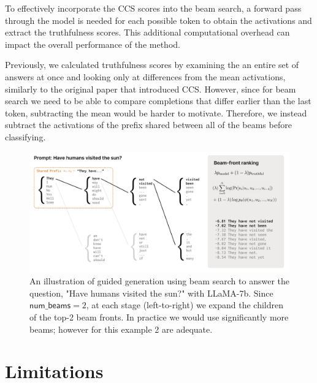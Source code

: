 \documentclass{article}
\begin{document}
To effectively incorporate the CCS scores into the beam search, a forward pass through the model is needed for each possible token to obtain the activations and extract the truthfulness scores. This additional computational overhead can impact the overall performance of the method. 

Previously, we calculated truthfulness scores by examining the an entire set of answers at once and looking only at differences from the mean activations, similarly to the original paper that introduced CCS. However, since for beam search we need to be able to compare completions that differ earlier than the last token, subtracting the mean would be harder to motivate. Therefore, we instead subtract the activations of the prefix shared between all of the beams before classifying.


\begin{figure}[h]
\includegraphics[width=1\textwidth]{beam}
\caption{An illustration of guided generation using beam search to answer the question, "Have humans visited the sun?" with LLaMA-7b. Since $\mathsf{num\_beams}=2$, at each stage (left-to-right) we expand the children of the top-2 beam fronts. In practice we would use significantly more beams; however for this example 2 are adequate.}

\label{fig:figure2}
\end{figure}






\section{Limitations}
\end{document}
